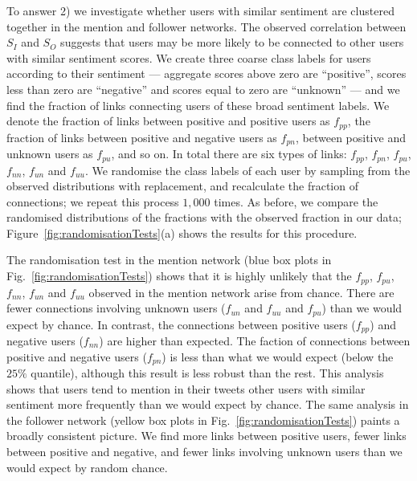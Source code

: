 \documentclass{article}
\newcommand{\MBD}[1]{\textcolor{blue}{{[\textbf{MBD:~#1}]}}}
\begin{document}
To answer 2) we investigate whether users with similar sentiment are
clustered together in the mention and follower networks. The observed
correlation between $S_I$ and $S_O$ suggests that users may be more
likely to be connected to other users with similar sentiment scores.
We create three coarse class labels for users according to their
sentiment --- aggregate scores above zero are ``positive'', scores
less than zero are ``negative'' and scores equal to zero are
``unknown'' --- and we find the fraction of links connecting users of
these broad sentiment labels.  We denote the fraction of links between
positive and positive users as $f_{pp}$, the fraction of links between
positive and negative users as $f_{pn}$, between positive and unknown
users as $f_{pu}$, and so on.  In total there are six types of links:
$f_{pp}$, $f_{pn}$, $f_{pu}$, $f_{nn}$, $f_{un}$ and $f_{uu}$. We
randomise the class labels of each user by sampling from the observed
distributions with replacement, and recalculate the fraction of
connections; we repeat this process $1,000$ times. As before, we
compare the randomised distributions of the fractions with the
observed fraction in our data; Figure~\ref{fig:randomisationTests}(a)
shows the results for this procedure.


The randomisation test in the mention network (blue box plots in
Fig.~\ref{fig:randomisationTests}) shows that it is highly unlikely
that the $f_{pp}$, $f_{pu}$, $f_{nn}$, $f_{un}$ and $f_{uu}$ observed
in the mention network arise from chance. There are fewer connections
involving unknown users ($f_{un}$ and $f_{uu}$ and $f_{pu}$) than we
would expect by chance.  In contrast, the connections between positive
users ($f_{pp}$) and negative users ($f_{nn}$) are higher than
expected.  The faction of connections between positive and negative
users ($f_{pn}$) is less than what we would expect (below the $25\%$
quantile), although this result is less robust than the rest.  This
analysis shows that users tend to mention in their tweets other users
with similar sentiment more frequently than we would expect by chance.
The same analysis in the follower network (yellow box plots in
Fig.~\ref{fig:randomisationTests}) paints a broadly consistent
picture.  We find more links between positive users, fewer links
between positive and negative, and fewer links involving unknown users
than we would expect by random chance.
\end{document}
